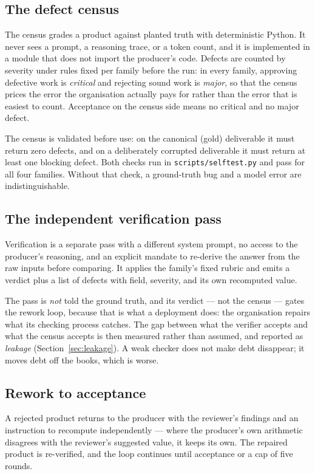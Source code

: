 \documentclass[11pt]{article}
\begin{document}
\subsection{The defect census}

The census grades a product against planted truth with deterministic Python. It never sees a
prompt, a reasoning trace, or a token count, and it is implemented in a module that does not import
the producer's code. Defects are counted by severity under rules fixed per family before the run:
in every family, approving defective work is \emph{critical} and rejecting sound work is
\emph{major}, so that the census prices the error the organisation actually pays for rather than
the error that is easiest to count. Acceptance on the census side means no critical and no major
defect.

The census is validated before use: on the canonical (gold) deliverable it must return zero
defects, and on a deliberately corrupted deliverable it must return at least one blocking defect.
Both checks run in \texttt{scripts/selftest.py} and pass for all four families. Without that
check, a ground-truth bug and a model error are indistinguishable.

\subsection{The independent verification pass}

Verification is a separate pass with a different system prompt, no access to the producer's
reasoning, and an explicit mandate to re-derive the answer from the raw inputs before comparing.
It applies the family's fixed rubric and emits a verdict plus a list of defects with field,
severity, and its own recomputed value.

The pass is \emph{not} told the ground truth, and its verdict --- not the census --- gates the
rework loop, because that is what a deployment does: the organisation repairs what its checking
process catches. The gap between what the verifier accepts and what the census accepts is then
measured rather than assumed, and reported as \emph{leakage}
(Section~\ref{sec:leakage}). A weak checker does not make debt disappear; it moves debt off the
books, which is worse.

\subsection{Rework to acceptance}

A rejected product returns to the producer with the reviewer's findings and an instruction to
recompute independently --- where the producer's own arithmetic disagrees with the reviewer's
suggested value, it keeps its own. The repaired product is re-verified, and the loop continues
until acceptance or a cap of five rounds.
\end{document}
